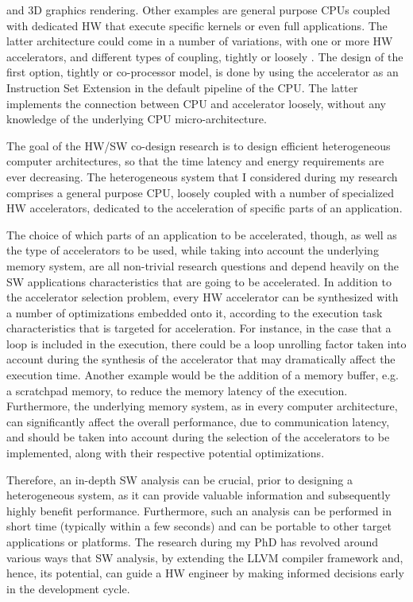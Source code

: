 \documentclass[]{usiinfthesis}
\begin{document}
and 3D graphics rendering. Other examples are general purpose CPUs coupled with dedicated HW
that execute specific kernels or even full applications. The latter architecture could come 
in a number of variations, with one or more HW accelerators, and different types of coupling, 
tightly or loosely \cite{CotaJun15}. The design of the first option, tightly or co-processor model, 
is done by using the accelerator as an Instruction Set Extension in the default pipeline of the CPU. 
The latter implements the connection between CPU and accelerator loosely, without any 
knowledge of the underlying CPU micro-architecture.\par
%
%
The goal of the HW/SW co-design research is to design efficient heterogeneous computer architectures, so that the
time latency and energy requirements are ever decreasing. The heterogeneous system
that I considered during my research comprises a general purpose CPU, loosely coupled with a number of 
specialized HW accelerators, dedicated to the acceleration of specific parts of an application.\par

The choice of which parts of an application to be accelerated, though, as well as the type 
of accelerators to be used, while taking into account the underlying memory system, are all
non-trivial research questions and depend heavily on the SW applications characteristics that
are going to be accelerated. In addition to the accelerator selection problem, 
every HW accelerator can be synthesized with a number of optimizations embedded onto it, according to 
the execution task characteristics that is targeted for acceleration. For instance, in the case that 
a loop is included in the execution, there could be a loop unrolling factor taken into account during 
the synthesis of the accelerator that may dramatically affect the execution time. Another example 
would be the addition of a memory buffer, e.g. a scratchpad memory, to reduce the memory latency
of the execution. Furthermore, the underlying memory system, as in every computer architecture, can
significantly affect the overall performance, due to communication latency, and should be taken into 
account during the selection of the accelerators to be implemented, along with their respective 
potential optimizations.\par

Therefore, an in-depth SW analysis can be crucial, prior to 
designing a heterogeneous system, as it can provide valuable information and subsequently 
highly benefit performance. Furthermore, such an analysis can be performed in short time (typically within a few seconds) and can be portable to other target applications or platforms. 
The research during my PhD has revolved around various ways that SW
analysis, by extending the LLVM compiler framework \cite{LattnerMar04} and, hence, its potential,
can guide a HW engineer %
by making informed decisions early in the development cycle.
\end{document}
